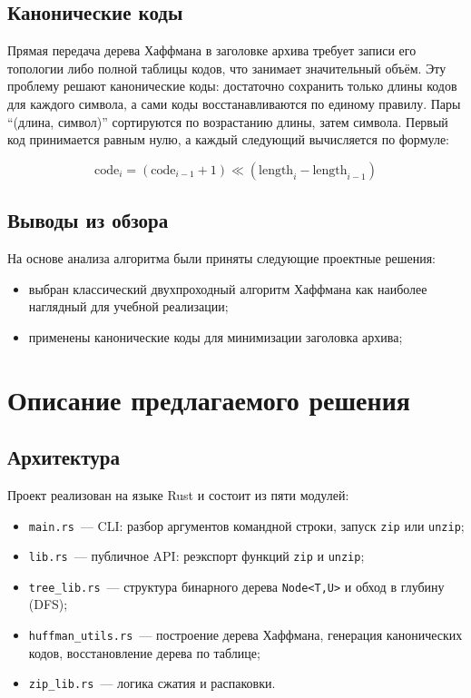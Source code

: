 \documentclass[a4paper]{article}
\begin{document}
\subsection{Канонические коды}

Прямая передача дерева Хаффмана в заголовке архива требует записи его
топологии либо полной таблицы кодов, что занимает значительный объём.
Эту проблему решают канонические коды: достаточно сохранить только длины
кодов для каждого символа, а сами коды восстанавливаются по единому
правилу. Пары \enquote{(длина, символ)} сортируются по возрастанию длины,
затем символа. Первый код принимается равным нулю, а каждый следующий
вычисляется по формуле:

\[
\text{code}_{i} = (\text{code}_{i-1} + 1) \ll (\text{length}_i - \text{length}_{i-1})
\]

\subsection{Выводы из обзора}

На основе анализа алгоритма были приняты следующие проектные решения:
\begin{itemize}
    \item выбран классический двухпроходный алгоритм Хаффмана как
          наиболее наглядный для учебной реализации;
    \item применены канонические коды для минимизации заголовка архива;
\end{itemize}

\section{Описание предлагаемого решения}


\subsection{Архитектура}

Проект реализован на языке Rust и состоит из пяти модулей:
\begin{itemize}
    \item \texttt{main.rs}~--- CLI: разбор аргументов командной строки,
          запуск \texttt{zip} или \texttt{unzip};
    \item \texttt{lib.rs}~--- публичное API: реэкспорт функций
          \texttt{zip} и \texttt{unzip};
    \item \texttt{tree\_lib.rs}~--- структура бинарного дерева
          \texttt{Node<T,U>} и обход в глубину (DFS);
    \item \texttt{huffman\_utils.rs}~--- построение дерева Хаффмана,
          генерация канонических кодов, восстановление дерева по таблице;
    \item \texttt{zip\_lib.rs}~--- логика сжатия и распаковки.
\end{itemize}
\end{document}
